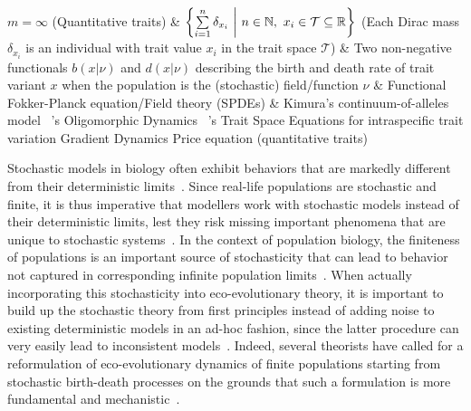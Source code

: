 {\begin{sideways}
\begin{minipage}{\textheight}
{\begin{tabular}
					$m = \infty$ \newline (Quantitative traits) & $ \left\{\sum\limits_{i=1}^{n}\delta_{x_i} \ \bigg{|} \ n \in \mathbb{N}, \ x_i \in \mathcal{T} \subseteq \mathbb{R}\right\}$ \newline \newline (Each Dirac mass $\delta_{x_i}$ is an individual with trait value $x_i$ in the trait space $\mathcal{T}$) & Two non-negative functionals $b(x|\nu)$ and $d(x|\nu)$ describing the birth and death rate of trait variant $x$ when the population is the (stochastic) field/function $\nu$ & Functional Fokker-Planck equation/Field theory \newline (SPDEs) & Kimura's continuum-of-alleles model \newline~\cite{sasaki_oligomorphic_2011}'s Oligomorphic Dynamics \newline~\cite{wickman_theoretical_2022}'s Trait Space Equations for intraspecific trait variation \newline Gradient Dynamics \newline Price equation (quantitative traits)\\
					\hline
				\end{tabular}
			}
			\label{table_summary}
		\end{minipage}
	\end{sideways}\par}
\clearpage

Stochastic models in biology often exhibit behaviors that are markedly different from their deterministic limits~\citep{jafarpour_noise-induced_2017,boettiger_noise_2018,jhawar_noise-induced_2020,coomer_noise_2022}. Since real-life populations are stochastic and finite, it is thus imperative that modellers work with stochastic models instead of their deterministic limits, lest they risk missing important phenomena that are unique to stochastic systems~\citep{black_stochastic_2012,hastings_transients_2004,shoemaker_integrating_2020,schreiber_does_2022}. In the context of population biology, the finiteness of populations is an important source of stochasticity that can lead to behavior not captured in corresponding infinite population limits~\citep{black_stochastic_2012,rogers_demographic_2012,debarre_evolutionary_2016,delong_stochasticity_2023}. When actually incorporating this stochasticity into eco-evolutionary theory, it is important to build up the stochastic theory from first principles instead of adding noise to existing deterministic models in an ad-hoc fashion, since the latter procedure can very easily lead to inconsistent models~\citep{strang_how_2019}. Indeed, several theorists have called for a reformulation of eco-evolutionary dynamics of finite populations starting from stochastic birth-death processes on the grounds that such a formulation is more fundamental and mechanistic~\citep{metcalf_why_2007,geritz_mathematical_2012,doebeli_towards_2017}.

